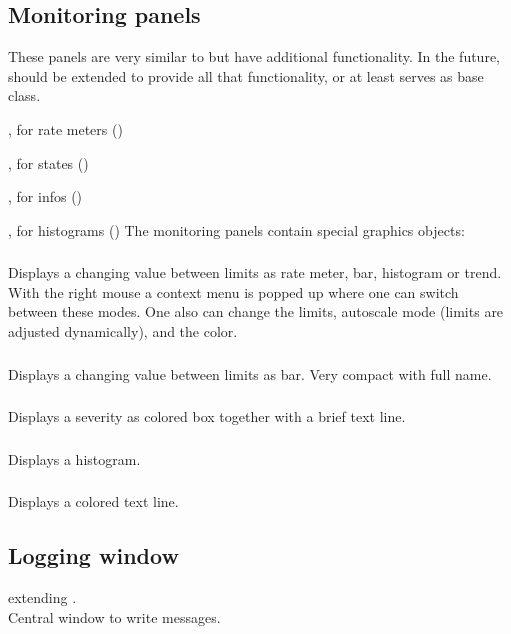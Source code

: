 \subsection{Monitoring panels}
These panels are very similar to  but have additional
functionality. 
 In the future,  should be extended to provide all that functionality, or at least serves as base class.
\bdes
\item [\class{xPanelMeter}:]  , for rate meters ()
\item [\class{xPanelState}:]  , for states ()
\item [\class{xPanelInfo}:]   , for infos ()
\item [\class{xPanelHisto}:]  , for histograms ()
\edes
The monitoring panels contain special graphics objects:
\subsubsection{}
Displays a changing value between limits as rate meter, bar, histogram or trend.
With the right mouse a context menu is popped up where one can switch between these
modes. One also can change the limits, autoscale mode (limits are adjusted dynamically),
and the color.
\subsubsection{}
Displays a changing value between limits as bar. Very compact with full name.
\subsubsection{}
Displays a severity as colored box together with a brief text line.
\subsubsection{}
Displays a histogram.
\subsubsection{}
Displays a colored text line.
\subsection{Logging window}
 extending .\\
Central window to write messages.

